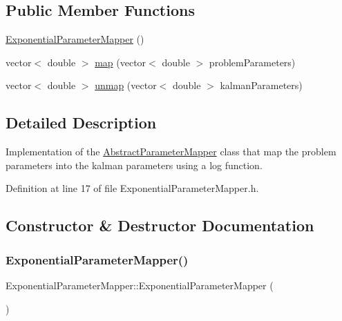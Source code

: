 \subsection*{Public Member Functions}
\begin{DoxyCompactItemize}
\item 
\mbox{\hyperlink{classExponentialParameterMapper_ac2e4af5f64676cb7a3ff664ff92f50fb}{Exponential\+Parameter\+Mapper}} ()
\item 
vector$<$ double $>$ \mbox{\hyperlink{classExponentialParameterMapper_a6abcf5b0efb8ef01ced062b7498c923e}{map}} (vector$<$ double $>$ problem\+Parameters)
\item 
vector$<$ double $>$ \mbox{\hyperlink{classExponentialParameterMapper_ad7040a1ac834e53691bd157df925c545}{unmap}} (vector$<$ double $>$ kalman\+Parameters)
\end{DoxyCompactItemize}


\subsection{Detailed Description}
Implementation of the \mbox{\hyperlink{classAbstractParameterMapper}{Abstract\+Parameter\+Mapper}} class that map the problem parameters into the kalman parameters using a log function. 

Definition at line 17 of file Exponential\+Parameter\+Mapper.\+h.



\subsection{Constructor \& Destructor Documentation}
\mbox{\label{classExponentialParameterMapper_ac2e4af5f64676cb7a3ff664ff92f50fb}} 
\subsubsection{\texorpdfstring{Exponential\+Parameter\+Mapper()}{ExponentialParameterMapper()}}
{\footnotesize\ttfamily Exponential\+Parameter\+Mapper\+::\+Exponential\+Parameter\+Mapper (\begin{DoxyParamCaption}{ }\end{DoxyParamCaption})}

